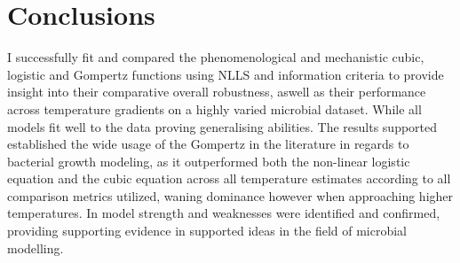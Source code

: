 \documentclass[11pt]{article}
\begin{document}
\section{Conclusions}
I successfully fit and compared the phenomenological and mechanistic cubic, logistic and Gompertz functions using NLLS and information criteria to provide insight into their comparative overall robustness, aswell as their performance across temperature gradients on a highly varied microbial dataset. While all models fit well to the data proving generalising abilities. The results supported established the wide usage of the Gompertz in the literature in regards to bacterial growth modeling, as it outperformed both the non-linear logistic equation and the cubic equation across all temperature estimates according to all comparison metrics utilized, waning dominance however when approaching higher temperatures. In model strength and weaknesses were identified and confirmed, providing supporting evidence in supported ideas in the field of microbial modelling. 


\pagebreak


\end{document}
